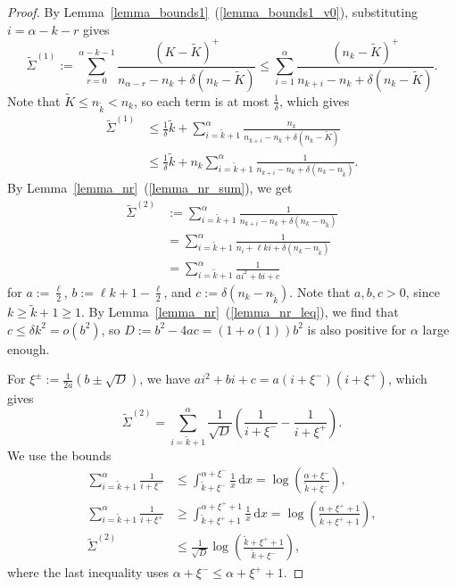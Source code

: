 \documentclass{article}
\theoremstyle{plain}
\theoremstyle{remark}
\theoremstyle{plain}
\numberwithin{equation}{section}
\begin{document}
	\begin{proof}
		By Lemma~\ref{lemma_bounds1}~(\ref{lemma_bounds1_v0}), substituting $i=\alpha-k-r$ gives $$\widetilde{\Sigma}^{(1)}:=\sum_{r=0}^{\alpha-k-1}\frac{(K-\widetilde{K})^+}{n_{\alpha-r}-n_k+\delta(n_k-\widetilde{K})}\leq\sum_{i=1}^{\alpha}\frac{(n_k-\widetilde{K})^+}{n_{k+i}-n_k+\delta(n_k-\widetilde{K})}.$$ Note that $\widetilde{K}\leq n_{\tilde{k}}<n_k$, so each term is at most $\tfrac1{\delta}$, which gives
		\begin{align}
			\widetilde{\Sigma}^{(1)}
			&\leq\tfrac1{\delta}\widetilde{k}+\sum_{i=\tilde{k}+1}^{\alpha}\frac{n_k}{n_{k+i}-n_k+\delta(n_k-\widetilde{K})}
			\\&\leq\tfrac1{\delta}\widetilde{k}+n_k\sum_{i=\tilde{k}+1}^{\alpha}\frac{1}{n_{k+i}-n_k+\delta(n_k-n_{\tilde{k}})}.
		\end{align}
		By Lemma~\ref{lemma_nr}~(\ref{lemma_nr_sum}), we get
		\begin{align}
			\widetilde{\Sigma}^{(2)}
			&:=\sum_{i=\tilde{k}+1}^{\alpha}\frac{1}{n_{k+i}-n_k+\delta(n_k-n_{\tilde{k}})}
			\\&=\sum_{i=\tilde{k}+1}^{\alpha}\frac{1}{n_i+\ell ki+\delta(n_k-n_{\tilde{k}})}
			\\&=\sum_{i=\tilde{k}+1}^{\alpha}\frac{1}{ai^2+bi+c}
		\end{align}
		for $a:=\tfrac{\ell}{2}$, $b:=\ell k+1-\tfrac{\ell}{2}$, and $c:=\delta(n_k-n_{\tilde{k}})$. Note that $a,b,c>0$, since $k\geq\widetilde{k}+1\geq1$. By Lemma~\ref{lemma_nr}~(\ref{lemma_nr_leq}), we find that $c\leq\delta k^2=o(b^2)$, so $D:=b^2-4ac=(1+o(1))b^2$ is also positive for $\alpha$ large enough.
		
		For $\xi^{\pm}:=\tfrac1{2a}(b\pm\sqrt{D})$, we have $ai^2+bi+c=a(i+\xi^-)(i+\xi^+)$, which gives $$\widetilde{\Sigma}^{(2)}=\sum_{i=\tilde{k}+1}^{\alpha}\frac1{\sqrt{D}}\left(\frac1{i+\xi^-}-\frac1{i+\xi^+}\right).$$ We use the bounds
		\begin{align}
			\sum_{i=\tilde{k}+1}^{\alpha}\frac1{i+\xi^-}
			&\leq\int_{\tilde{k}+\xi^-}^{\alpha+\xi^-}\frac1x\,\mathrm{d}x=\log\left(\frac{\alpha+\xi^-}{\tilde{k}+\xi^-}\right),
			\\\sum_{i=\tilde{k}+1}^{\alpha}\frac1{i+\xi^+}
			&\geq\int_{\tilde{k}+\xi^++1}^{\alpha+\xi^++1}\frac1x\,\mathrm{d}x=\log\left(\frac{\alpha+\xi^++1}{\tilde{k}+\xi^++1}\right),
			\\\widetilde{\Sigma}^{(2)}&\leq\frac1{\sqrt{D}}\log\left(\frac{\tilde{k}+\xi^++1}{\tilde{k}+\xi^-}\right),
		\end{align}
		where the last inequality uses $\alpha+\xi^-\leq\alpha+\xi^++1$.
		

\end{proof}
\end{document}
